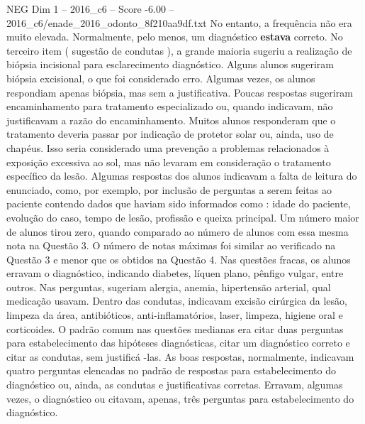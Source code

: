 \begin{textsample}{NEG Dim 1 – 2016\_c6 – Score -6.00 – 2016\_c6/enade\_2016\_odonto\_8f210aa9df.txt}
No entanto, a frequência não era muito elevada.
Normalmente, pelo menos, um diagnóstico \textbf{estava} correto.
No terceiro item ( sugestão de condutas ), a grande maioria sugeriu a realização de biópsia incisional para esclarecimento diagnóstico.
Alguns alunos sugeriram biópsia excisional, o que foi considerado erro.
Algumas vezes, os alunos respondiam apenas biópsia, mas sem a justificativa.
Poucas respostas sugeriram encaminhamento para tratamento especializado ou, quando indicavam, não justificavam a razão do encaminhamento.
Muitos alunos responderam que o tratamento deveria passar por indicação de protetor solar ou, ainda, uso de chapéus.
Isso seria considerado uma prevenção a problemas relacionados à exposição excessiva ao sol, mas não levaram em consideração o tratamento específico da lesão.
Algumas respostas dos alunos indicavam a falta de leitura do enunciado, como, por exemplo, por inclusão de perguntas a serem feitas ao paciente contendo dados que haviam sido informados como : idade do paciente, evolução do caso, tempo de lesão, profissão e queixa principal.
Um número maior de alunos tirou zero, quando comparado ao número de alunos com essa mesma nota na Questão 3.
O número de notas máximas foi similar ao verificado na Questão 3 e menor que os obtidos na Questão 4.
Nas questões fracas, os alunos erravam o diagnóstico, indicando diabetes, líquen plano, pênfigo vulgar, entre outros.
Nas perguntas, sugeriam alergia, anemia, hipertensão arterial, qual medicação usavam.
Dentro das condutas, indicavam excisão cirúrgica da lesão, limpeza da área, antibióticos, anti-inflamatórios, laser, limpeza, higiene oral e corticoides.
O padrão comum nas questões medianas era citar duas perguntas para estabelecimento das hipóteses diagnósticas, citar um diagnóstico correto e citar as condutas, sem justificá -las.
As boas respostas, normalmente, indicavam quatro perguntas elencadas no padrão de respostas para estabelecimento do diagnóstico ou, ainda, as condutas e justificativas corretas.
Erravam, algumas vezes, o diagnóstico ou citavam, apenas, três perguntas para estabelecimento do diagnóstico.

\end{textsample}
